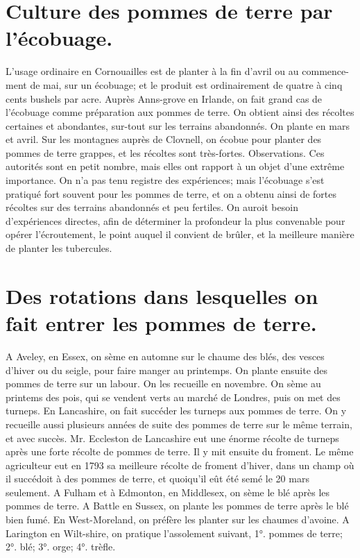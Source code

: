 \section{Culture des pommes de terre par l'écobuage.}
L'usage ordinaire en Cornouailles est de planter à la fin d'avril ou au commence-\setcounter{page}{284} ment de mai, sur un écobuage; et le produit est ordinairement de quatre à cinq cents bushels par acre.
Auprès Anns-grove en Irlande, on fait grand cas de l'écobuage comme préparation aux pommes de terre. On obtient ainsi des récoltes certaines et abondantes, sur-tout sur les terrains abandonnés. On plante en mars et avril.
Sur les montagnes auprès de Clovnell, on écobue pour planter des pommes de terre grappes, et les récoltes sont très-fortes.
Observations.
Ces autorités sont en petit nombre, mais elles ont rapport à un objet d'une extrême importance. On n'a pas tenu registre des expériences; mais l'écobuage s'est pratiqué fort souvent pour les pommes de terre, et on a obtenu ainsi de fortes récoltes sur des terrains abandonnés et peu fertiles. On auroit besoin d'expériences directes, afin de déterminer la profondeur la plus convenable pour opérer l'écroutement, le point auquel il convient de brûler, et la meilleure manière de planter les tubercules.\setcounter{page}{285} \section{Des rotations dans lesquelles on fait entrer les pommes de terre.}
A Aveley, en Essex, on sème en automne sur le chaume des blés, des vesces d'hiver ou du seigle, pour faire manger au printemps. On plante ensuite des pommes de terre sur un labour. On les recueille en novembre. On sème au printems des pois, qui se vendent verts au marché de Londres, puis on met des turneps.
En Lancashire, on fait succéder les turneps aux pommes de terre. On y recueille aussi plusieurs années de suite des pommes de terre sur le même terrain, et avec succès.
Mr. Eccleston de Lancashire eut une énorme récolte de turneps après une forte récolte de pommes de terre. Il y mit ensuite du froment. Le même agriculteur eut en 1793 sa meilleure récolte de froment d'hiver, dans un champ où il succédoit à des pommes de terre, et quoiqu'il eût été semé le 20 mars seulement.
A Fulham et à Edmonton, en Middlesex, on sème le blé après les pommes de terre. A Battle en Sussex, on plante les pommes de terre après le blé bien fumé.
En West-Moreland, on préfère les planter sur les chaumes d'avoine.\setcounter{page}{286} A Larington en Wilt-shire, on pratique l'assolement suivant, 1°. pommes de terre; 2°. blé; 3°. orge; 4°. trèfle.
